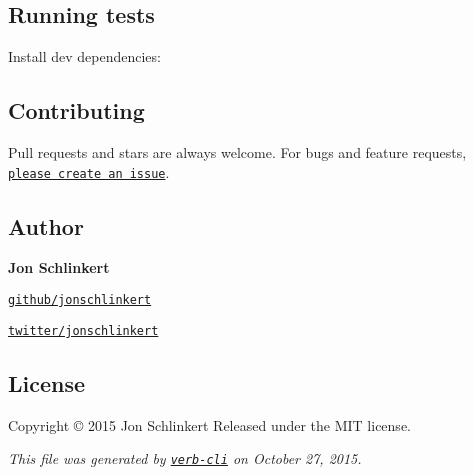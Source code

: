 \subsection*{Running tests}

Install dev dependencies\+:




\subsection*{Contributing}

Pull requests and stars are always welcome. For bugs and feature requests, \href{https://github.com/jonschlinkert/center-align/issues/new}{\tt please create an issue}.

\subsection*{Author}

{\bfseries Jon Schlinkert}


\begin{DoxyItemize}
\item \href{https://github.com/jonschlinkert}{\tt github/jonschlinkert}
\item \href{http://twitter.com/jonschlinkert}{\tt twitter/jonschlinkert}
\end{DoxyItemize}

\subsection*{License}

Copyright © 2015 Jon Schlinkert Released under the M\+IT license.





{\itshape This file was generated by \href{https://github.com/assemble/verb-cli}{\tt verb-\/cli} on October 27, 2015.} 